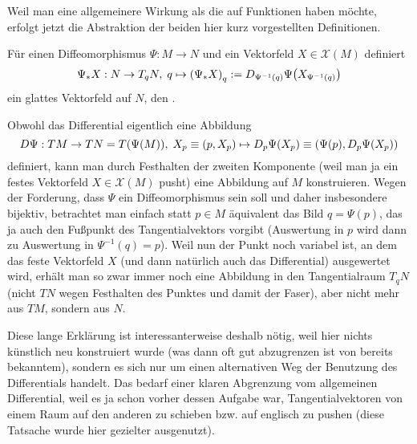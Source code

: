 \documentclass[../H_Analysis_main.tex]{subfiles}
\begin{document}
Weil man eine allgemeinere Wirkung als die auf Funktionen haben möchte, erfolgt jetzt die Abstraktion der beiden hier kurz vorgestellten Definitionen.
\begin{defi}
Für einen Diffeomorphismus $\Psi: M \rightarrow N$ und ein Vektorfeld $X \in \mathcal{X}(M)$ definiert
\begin{equation}
\Psi_* X: N \rightarrow T_q N, \; q \mapsto \qty(\Psi_* X)_q := D_{\Psi^{-1}(q)} \Psi\qty(X_{\Psi^{-1}(q)})
\end{equation}
ein glattes Vektorfeld auf $N$, den .
\end{defi}
Obwohl das Differential eigentlich eine Abbildung
\begin{equation*}
D \Psi: TM \rightarrow TN = T \qty(\Psi(M)) , \; X_p \equiv \qty(p, X_p) \mapsto D_p \Psi\qty(X_p) \equiv \qty(\Psi(p), D_p \Psi\qty(X_p))
\end{equation*}
definiert, kann man durch Festhalten der zweiten Komponente (weil man ja ein festes Vektorfeld $X \in \mathcal{X}(M)$ pusht) eine Abbildung auf $M$ konstruieren. Wegen der Forderung, dass $\Psi$ ein Diffeomorphismus sein soll und daher insbesondere bijektiv, betrachtet man einfach statt $p \in M$ äquivalent das Bild $q = \Psi(p)$, das ja auch den Fußpunkt des Tangentialvektors vorgibt (Auswertung in $p$ wird dann zu Auswertung in $\Psi^{-1}(q) = p$). Weil nun der Punkt noch variabel ist, an dem das feste Vektorfeld $X$ (und dann natürlich auch das Differential) ausgewertet wird, erhält man so zwar immer noch eine Abbildung in den Tangentialraum $T_q N$ (nicht $TN$ wegen Festhalten des Punktes und damit der Faser), aber nicht mehr aus $TM$, sondern aus $N$.

Diese lange Erklärung ist interessanterweise deshalb nötig, weil hier nichts künstlich neu konstruiert wurde (was dann oft gut abzugrenzen ist von bereits bekanntem), sondern es sich nur um einen alternativen Weg der Benutzung des Differentials handelt. Das bedarf einer klaren Abgrenzung vom allgemeinen Differential, weil es ja schon vorher dessen Aufgabe war, Tangentialvektoren von einem Raum auf den anderen zu schieben bzw. auf englisch zu pushen (diese Tatsache wurde hier gezielter ausgenutzt).

\end{document}

